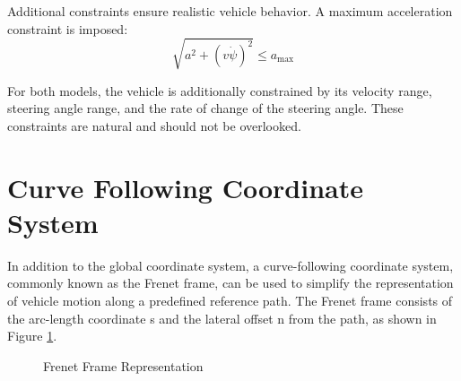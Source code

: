 Additional constraints ensure realistic vehicle behavior.
A maximum acceleration
constraint is imposed:
\begin{equation}
	\label{eq:friction_constraint}
	\sqrt{a^2 + (v\dot{\psi})^2} \leq a_{\max}
\end{equation}

For both models, the vehicle is additionally constrained by its velocity range, steering angle range, and the rate of change of the steering angle.
These constraints are natural and should not be overlooked.

\section{Curve Following Coordinate System} \label{subsec:curve_following_coordinate_system}

In addition to the global coordinate system, a curve-following coordinate system, commonly known as the Frenet frame, can be used to simplify the
representation of vehicle motion along a predefined reference path.
The Frenet frame consists of the arc-length coordinate s and the lateral offset n from the path, as shown in Figure \ref{fig:frenet_frame}.

\begin{figure}[h]
	\centering
	\caption{Frenet Frame Representation}
	\label{fig:frenet_frame}
\end{figure}